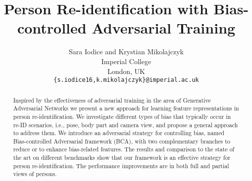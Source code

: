 \documentclass[10pt,twocolumn,letterpaper]{article}
\begin{document}
\title{Person Re-identification with Bias-controlled Adversarial Training}

\author{Sara Iodice and Krystian Mikolajczyk\\
Imperial College\\
London, UK\\
{\tt\small {\{s.iodice16,k.mikolajczyk\}}@imperial.ac.uk}
}

\maketitle



\begin{abstract}
   Inspired by the effectiveness of adversarial training in the area of Generative Adversarial Networks we present a new approach for learning feature representations in person re-identification. We investigate different types of bias that typically occur in re-ID scenarios, i.e., pose, body part and camera view, and propose a general approach to address them. We introduce an adversarial strategy for controlling bias, named Bias-controlled Adversarial framework (BCA), with two complementary branches to reduce or to enhance bias-related features. The results and comparison to the state of the art on different benchmarks show that our framework is an effective strategy for person re-identification. The performance improvements are in both full and partial views of persons. 
\end{abstract}
\end{document}
